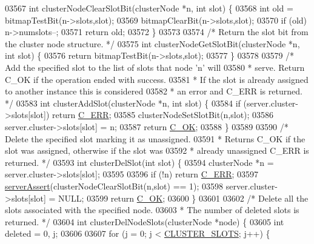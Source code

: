 \begin{DoxyCode}
{{{{{{{{{{{{{{{{{{{{{{{{{{{{{{{{{{{{{{{{{{{{{{{{{{{{{{{{{{{{{03567 \textcolor{keywordtype}{int} clusterNodeClearSlotBit(clusterNode *n, \textcolor{keywordtype}{int} slot) \{
03568     \textcolor{keywordtype}{int} old = bitmapTestBit(n->slots,slot);
03569     bitmapClearBit(n->slots,slot);
03570     \textcolor{keywordflow}{if} (old) n->numslots--;
03571     \textcolor{keywordflow}{return} old;
03572 \}
03573 
03574 \textcolor{comment}{/* Return the slot bit from the cluster node structure. */}
03575 \textcolor{keywordtype}{int} clusterNodeGetSlotBit(clusterNode *n, \textcolor{keywordtype}{int} slot) \{
03576     \textcolor{keywordflow}{return} bitmapTestBit(n->slots,slot);
03577 \}
03578 
03579 \textcolor{comment}{/* Add the specified slot to the list of slots that node 'n' will}
03580 \textcolor{comment}{ * serve. Return C\_OK if the operation ended with success.}
03581 \textcolor{comment}{ * If the slot is already assigned to another instance this is considered}
03582 \textcolor{comment}{ * an error and C\_ERR is returned. */}
03583 \textcolor{keywordtype}{int} clusterAddSlot(clusterNode *n, \textcolor{keywordtype}{int} slot) \{
03584     \textcolor{keywordflow}{if} (server.cluster->slots[slot]) \textcolor{keywordflow}{return} \hyperlink{server_8h_af98ac28d5f4d23d7ed5985188e6fb7d1}{C\_ERR};
03585     clusterNodeSetSlotBit(n,slot);
03586     server.cluster->slots[slot] = n;
03587     \textcolor{keywordflow}{return} \hyperlink{server_8h_a303769ef1065076e68731584e758d3e1}{C\_OK};
03588 \}
03589 
03590 \textcolor{comment}{/* Delete the specified slot marking it as unassigned.}
03591 \textcolor{comment}{ * Returns C\_OK if the slot was assigned, otherwise if the slot was}
03592 \textcolor{comment}{ * already unassigned C\_ERR is returned. */}
03593 \textcolor{keywordtype}{int} clusterDelSlot(\textcolor{keywordtype}{int} slot) \{
03594     clusterNode *n = server.cluster->slots[slot];
03595 
03596     \textcolor{keywordflow}{if} (!n) \textcolor{keywordflow}{return} \hyperlink{server_8h_af98ac28d5f4d23d7ed5985188e6fb7d1}{C\_ERR};
03597     \hyperlink{server_8h_a88114b5169b4c382df6b56506285e56a}{serverAssert}(clusterNodeClearSlotBit(n,slot) == 1);
03598     server.cluster->slots[slot] = NULL;
03599     \textcolor{keywordflow}{return} \hyperlink{server_8h_a303769ef1065076e68731584e758d3e1}{C\_OK};
03600 \}
03601 
03602 \textcolor{comment}{/* Delete all the slots associated with the specified node.}
03603 \textcolor{comment}{ * The number of deleted slots is returned. */}
03604 \textcolor{keywordtype}{int} clusterDelNodeSlots(clusterNode *node) \{
03605     \textcolor{keywordtype}{int} deleted = 0, j;
03606 
03607     \textcolor{keywordflow}{for} (j = 0; j < \hyperlink{cluster_8h_aa3e2cb951eebb16725ecc3f5beefd9fd}{CLUSTER\_SLOTS}; j++) \{
}}}}}}}}}}}}}}}}}}}}}}}}}}}}}}}}}}}}}}}}}}}}}}}}}}}}}}}}}}}}}
\end{DoxyCode}
